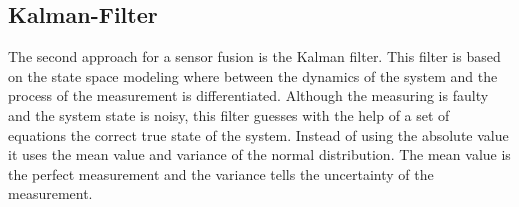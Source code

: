
\subsection{Kalman-Filter}
\label{subsec:Kalman-Filter}

The second approach for a sensor fusion is the Kalman filter. This filter is based on the state space modeling where between the dynamics of the system and the process of the measurement is differentiated. Although the measuring is faulty and the system state is noisy, this filter guesses with the help of a set of equations the correct true state of the system. Instead of using the absolute value it uses the mean value and variance of the normal distribution. The mean value is the perfect measurement and the variance tells the uncertainty of the measurement. 

